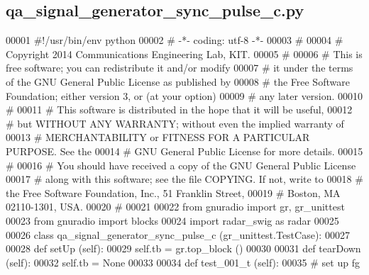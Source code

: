 \subsection{qa\+\_\+signal\+\_\+generator\+\_\+sync\+\_\+pulse\+\_\+c.\+py}
\label{qa__signal__generator__sync__pulse__c_8py_source}

\begin{DoxyCode}
00001 \textcolor{comment}{#!/usr/bin/env python}
00002 \textcolor{comment}{# -*- coding: utf-8 -*-}
00003 \textcolor{comment}{# }
00004 \textcolor{comment}{# Copyright 2014 Communications Engineering Lab, KIT.}
00005 \textcolor{comment}{# }
00006 \textcolor{comment}{# This is free software; you can redistribute it and/or modify}
00007 \textcolor{comment}{# it under the terms of the GNU General Public License as published by}
00008 \textcolor{comment}{# the Free Software Foundation; either version 3, or (at your option)}
00009 \textcolor{comment}{# any later version.}
00010 \textcolor{comment}{# }
00011 \textcolor{comment}{# This software is distributed in the hope that it will be useful,}
00012 \textcolor{comment}{# but WITHOUT ANY WARRANTY; without even the implied warranty of}
00013 \textcolor{comment}{# MERCHANTABILITY or FITNESS FOR A PARTICULAR PURPOSE.  See the}
00014 \textcolor{comment}{# GNU General Public License for more details.}
00015 \textcolor{comment}{# }
00016 \textcolor{comment}{# You should have received a copy of the GNU General Public License}
00017 \textcolor{comment}{# along with this software; see the file COPYING.  If not, write to}
00018 \textcolor{comment}{# the Free Software Foundation, Inc., 51 Franklin Street,}
00019 \textcolor{comment}{# Boston, MA 02110-1301, USA.}
00020 \textcolor{comment}{# }
00021 
00022 \textcolor{keyword}{from} gnuradio \textcolor{keyword}{import} gr, gr\_unittest
00023 \textcolor{keyword}{from} gnuradio \textcolor{keyword}{import} blocks
00024 \textcolor{keyword}{import} radar\_swig \textcolor{keyword}{as} radar
00025 
00026 \textcolor{keyword}{class }qa_signal_generator_sync_pulse_c (gr\_unittest.TestCase):
00027 
00028     \textcolor{keyword}{def }setUp (self):
00029         self.tb = gr.top\_block ()
00030 
00031     \textcolor{keyword}{def }tearDown (self):
00032         self.tb = \textcolor{keywordtype}{None}
00033 
00034     \textcolor{keyword}{def }test_001_t (self):
00035         \textcolor{comment}{# set up fg}

\end{DoxyCode}
